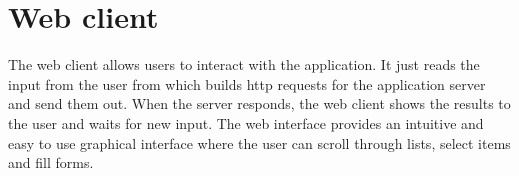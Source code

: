 \section{Web client}\label{sec:archweb}

The web client allows users to interact with the application. It just reads the
input from the user from which builds http requests for the application server
and send them out. When the server responds, the web client shows the results to
the user and waits for new input. The web interface provides an intuitive and
easy to use graphical interface where the user can scroll through lists, select
items and fill forms.
